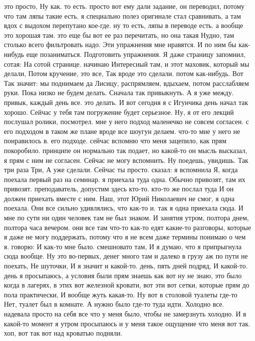 это просто, Ну как.
то есть. просто вот ему дали задание, он переводил, потому что там ляпы такие есть. я специально полез оригинале стал сравнивать, а там вдох с выдохом перепутано кое-где. ну то есть, ляпы в переводе есть. а вообще это хорошая там.
это еще бы вот ее раз перечитать, но она такая Нудно, там столько всего фильтровать надо.
Эти упражнения мне нравятся.
И по ним бы как-нибудь еще позаниматься.
Подготовить упражнения.
Я даже страницу запомнил, сотая:
На сотой странице.
начинаю Интересный там, и этот маховик, который мы делали, Потом кручение, это все, Так вроде это сделали.
потом как-нибудь. Вот Так значит: мы поднимаем да Лисицу, распрямляем, вдыхаем, потом расслабляем руки.
Пока низко не будем делать. Сначала так привыкнуть.
А я уже между.
привык, каждый день все.
это делать. И вот сегодня я с Игунчика день начал так хорошо. Сейчас у тебя там погружение будет серьезное. Ну, я от его лекций послушал ролики, посмотрел. мне у него подход маленечко не совсем согласен.
с его подходом в таком же плане вроде все шоугун делаем. что-то мне у него не понравилось в.
его подходе. сейчас вспомню что меня зацепило, как прям покоробило.
принципе он нормально так подает, но какой-то он мысль высказал, я прям с ним не согласен. Сейчас не могу вспомнить. Ну поедешь, увидишь.
Так три раза Три, А уже сделали.
Сейчас ты просто.
сказал: я вспомнила Я, когда поехала первый раз на семинар. я приехала туда одна. Обычно привозят,
там их привозят.
преподаватель, допустим здесь кто-то. кто-то же послал туда И он должен приехать вместе с ним. Наш, этот Юрий Николаевич не смог, я одна поехала. Они все сильно удивлялись, что как-то и.
так я одна приехала сюда.
И мне по сути ни один человек там не был знаком.
И занятия утром, полтора днем, полтора часа вечером. они все там что-то как-то едят какие-то разговоры, которые я даже не могу поддержать, потому что я не всем даже термины понимаю о чем я.
говорю: И как-то мне было.
смешновато там, И я думаю, что я припрыгнула сюда вообще. Ну это во-первых, денег много там и далеко в грузу аж по пути не поехать, Не шуточки, И я значит и какой-то.
день, пять дней подряд, И какой-то.
день я просыпаюсь, а условия были прям знаешь как вот ну не знаю, это было когда в лагерях, в этих вот железной кровати, вот эти вот сетки, которые прям до пола практически,
И вообще жуть какая-то.
Ну вот в столовой туалеты где-то Нет, туалет был в комнате.
А нужно было где-то туда идти.
Холодно все.
надевала просто на себя все что у меня было, чтобы не замерзнуть холодно. И в какой-то момент я утром просыпаюсь и у меня такое ощущение что
меня вот так.
хоп, вот так вот над кроватью подняли.
